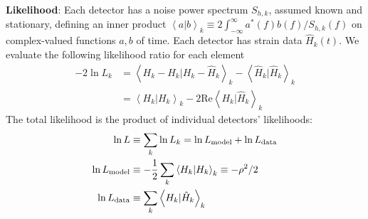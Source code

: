 \documentclass[twocolumn,prd,nofootinbib]{revtex4}
\newcommand\ForRichardOnly[1]{}
\newcommand\editremark[1]{{\color{red} #1}}
\newcommand\qmstateproduct[2]{\left\langle#1|#2\right\rangle}
\begin{document}
\noindent \textbf{Likelihood}: Each detector has a noise power spectrum $S_{h,k}$, assumed known and
stationary, defining an inner product $\qmstateproduct{a}{b}_k \equiv 2 \int_{-\infty}^\infty  a^*(f)b(f)/S_{h,k}(f)$ on
complex-valued functions $a,b$ of time.  Each detector has strain data $\hat{H}_k(t)$.  We evaluate the following likelihood ratio for each element
\begin{eqnarray}
-2\ln L_k &= \qmstateproduct{H_k-\hat{H}_k}{H_k-\hat{H}_k}_k - \qmstateproduct{\hat{H}_k}{\hat{H}_k}_k \\
  &= \qmstateproduct{H_k}{H_k}_k - 2 \text{Re} \qmstateproduct{H_k}{\hat{H}_k}_k 
\end{eqnarray}
The total likelihood is the product of individual detectors' likelihoods:
\begin{eqnarray}
\ln L &\equiv \sum_k \ln L_k  = \ln L_{\rm model} + \ln L_{\rm data} \\
\ln L_{\rm model} &\equiv -\frac{1}{2} \sum_k \qmstateproduct{H_k}{H_k}_k \equiv - \rho^2/2 \\
\ln L_{\rm data} &\equiv  \sum_k \qmstateproduct{H_k}{\hat{H}_k}_k 
\end{eqnarray}
\ForRichardOnly{
\begin{shaded}
\textbf{Efficiency of terms?}: As described below, the two terms in the log likelihood
\begin{itemize}
\item \emph{Model-only term}: This time-translation-independent $L_{\rm model}$ can be efficienly calculated from $\tilde{h}$ in the
  barycenter, for any sky location [Eq. \editremark{X}], from an O(N) operation.  To get $\tilde{h}$ in the barycenter for
  an arbitrary \emph{emission} direction, we need to sum over $\tilde{h}_{lm}(f)$ via
  Eq. (\ref{eq:def:hSpinWeightEmissionDirection})
\item \emph{Data term}: The other term can be efficiently computed for all times, sky locations, and emission directions
  by archiving $\qmstateproduct{h_{lm}\exp(-i\omega t)}{\hat{H}_k}$ timeseries [Eq. (\ref{eq:IndividualDetectorLikelihoodTimeseries:ViaSpinWeightBasis})].
\end{itemize}
\end{shaded}
}
\end{document}

